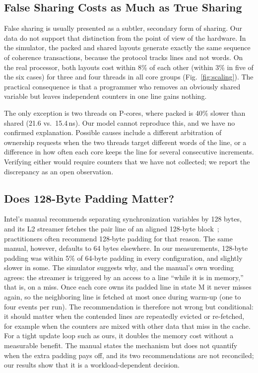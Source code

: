 \documentclass[journal]{IEEEtran}
\begin{document}
\subsection{False Sharing Costs as Much as True Sharing}
False sharing is usually presented as a subtler, secondary form of sharing.
Our data do not support that distinction from the point of view of the
hardware. In the simulator, the packed and shared layouts generate exactly the
same sequence of coherence transactions, because the protocol tracks lines and
not words. On the real processor, both layouts cost within 8\% of each other
(within 3\% in five of the six cases) for three and four threads in all core
groups (Fig.~\ref{fig:scaling}). The
practical consequence is that a programmer who removes an obviously shared
variable but leaves independent counters in one line gains nothing.

The only exception is two threads on P-cores, where packed is 40\% slower than
shared (21.6 vs.\ 15.4\,ns). Our model cannot reproduce this, and we have no
confirmed explanation. Possible causes include a different arbitration of
ownership requests when the two threads target different words of the line, or
a difference in how often each core keeps the line for several consecutive
increments. Verifying either would require counters that we have not
collected; we report the discrepancy as an open observation.

\subsection{Does 128-Byte Padding Matter?}
Intel's manual recommends separating synchronization variables by 128 bytes,
and its L2 streamer fetches the pair line of an aligned 128-byte
block~\cite{intel2024opt}; practitioners often recommend 128-byte padding for
that reason. The same manual, however, defaults to 64 bytes elsewhere.
In our measurements, 128-byte padding was within 5\% of 64-byte padding in
every configuration, and slightly slower in some. The simulator suggests why,
and the manual's own wording agrees: the streamer is triggered by an access to
a line ``while it is in memory,'' that is, on a miss. Once each core owns its
padded line in state M it never misses again, so the neighboring line is
fetched at most once during warm-up (one to four events per run). The recommendation is therefore
not wrong but conditional: it should matter when the contended lines are
repeatedly evicted or re-fetched, for example when the counters are mixed with
other data that miss in the cache. For a tight update loop such as ours, it
doubles the memory cost without a measurable benefit. The manual states the
mechanism but does not quantify when the extra padding pays off, and its two
recommendations are not reconciled; our results show that it is a
workload-dependent decision.
\end{document}

